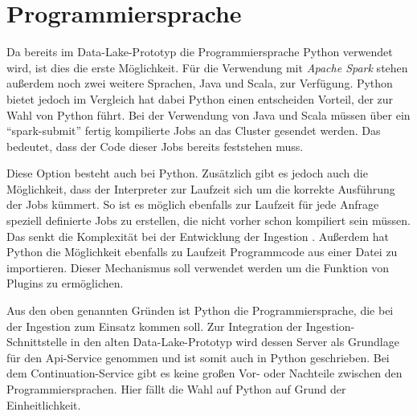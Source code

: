 \section{Programmiersprache}
Da bereits im Data-Lake-Prototyp die Programmiersprache Python verwendet wird, ist dies die erste Möglichkeit.
Für die Verwendung mit \textit{Apache Spark} stehen außerdem noch zwei weitere Sprachen, Java und Scala, zur Verfügung.
Python bietet jedoch im Vergleich hat dabei Python einen entscheiden Vorteil, der zur Wahl von Python führt.
Bei der Verwendung von Java und Scala müssen über ein "`spark-submit"' fertig kompilierte Jobs an das Cluster gesendet werden.
Das bedeutet, dass der Code dieser Jobs bereits feststehen muss.

Diese Option besteht auch bei Python.
Zusätzlich gibt es jedoch auch die Möglichkeit, dass der Interpreter zur Laufzeit sich um die korrekte Ausführung der Jobs kümmert.
So ist es möglich ebenfalls zur Laufzeit für jede Anfrage speziell definierte Jobs zu erstellen, die nicht vorher schon kompiliert sein müssen.
Das senkt die Komplexität bei der Entwicklung der Ingestion \parencite{pyspark-int}.
Außerdem hat Python die Möglichkeit ebenfalls zu Laufzeit Programmcode aus einer Datei zu importieren.
Dieser Mechanismus soll verwendet werden um die Funktion von Plugins zu ermöglichen.

Aus den oben genannten Gründen ist Python die Programmiersprache, die bei der Ingestion zum Einsatz kommen soll.
Zur Integration der Ingestion-Schnittstelle in den alten Data-Lake-Prototyp wird dessen Server als Grundlage für den Api-Service genommen und ist somit auch in Python geschrieben.
Bei dem Continuation-Service gibt es keine großen Vor- oder Nachteile zwischen den Programmiersprachen.
Hier fällt die Wahl auf Python auf Grund der Einheitlichkeit.

